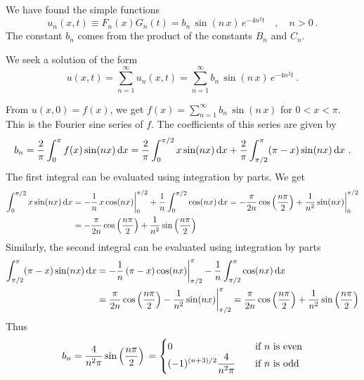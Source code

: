 \begin{egg}
We have found the simple functions
\[
u_n(x,t) \equiv F_n(x)G_n(t) = b_n\,\sin(n\,x)\, e^{-4n^2t} \quad , \quad
n>0 \ .
\]
The constant $b_n$ comes from the product of the constants $B_n$ and
$C_n$.

We seek a solution of the form
\[
u(x,t) = \sum_{n=1}^\infty u_n(x,t)
= \sum_{n=1}^\infty b_n\,\sin(n\,x)\, e^{-4n^2t} \  .
\]

From $u(x,0) = f(x)$, we get
$\displaystyle f(x) = \sum_{n=1}^\infty b_n\,\sin(n\,x)$
for $0<x<\pi$.  This is the Fourier sine series of $f$.  The coefficients of
this series are given by
\[
b_n = \frac{2}{\pi} \int_0^\pi f(x) \sin(nx)\,\mathrm{d}{x}
= \frac{2}{\pi} \int_0^{\pi/2} x\sin(nx) \,\mathrm{d}{x}
+ \frac{2}{\pi} \int_{\pi/2}^\pi (\pi-x) \sin(nx)\,\mathrm{d}{x} \ .
\]
The first integral can be evaluated using integration by parts.
We get
\begin{align*}
\int_0^{\pi/2} x\sin(nx) \,\mathrm{d}{x}
&= -\frac{1}{n}\,x\cos(nx)\bigg|_0^{\pi/2}
+ \frac{1}{n} \int_0^{\pi/2} \cos(nx) \,\mathrm{d}{x}
= -\frac{\pi}{2n}\cos\left(\frac{n\pi}{2}\right)
+ \frac{1}{n^2} \sin(nx)\bigg|_0^{\pi/2} \\
&= -\frac{\pi}{2n}\cos\left(\frac{n\pi}{2}\right) + \frac{1}{n^2}
\sin\left(\frac{n\pi}{2}\right)
\end{align*}
Similarly, the second integral can be evaluated using integration by
parts
\begin{align*}
\int_{\pi/2}^\pi (\pi-x) \sin(nx) \,\mathrm{d}{x}
&= -\frac{1}{n}\,(\pi-x)\cos(nx)\bigg|_{\pi/2}^\pi
- \frac{1}{n} \int_{\pi/2}^\pi \cos(nx) \,\mathrm{d}{x} \\
&= \frac{\pi}{2n}\cos\left(\frac{n\pi}{2}\right)
- \frac{1}{n^2} \sin(nx)\bigg|_{\pi/2}^\pi
= \frac{\pi}{2n}\cos\left(\frac{n\pi}{2}\right) + \frac{1}{n^2}
\sin\left(\frac{n\pi}{2}\right)
\end{align*}
Thus
\[
b_n = \frac{4}{n^2 \pi} \sin\left(\frac{n\pi}{2}\right) \\
=
\begin{cases}
0 & \quad \text{if $n$ is even} \\
\displaystyle (-1)^{(n+3)/2}\frac{4}{n^2 \pi} & \quad \text{if $n$ is odd}
\end{cases}
\]


\end{egg}
